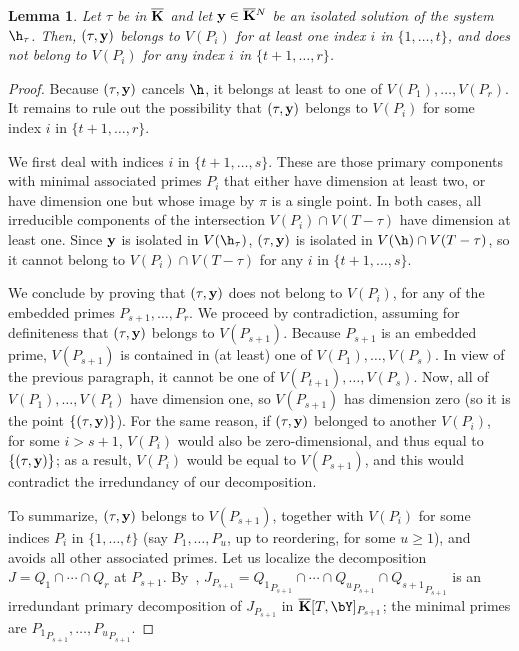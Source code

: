 \documentclass[12pt]{article}
\newtheorem{lemma}[definition]{Lemma}
\begin{document}
\begin{lemma}\label{lemma:vPi}
  Let $\tau$ be in $\overline{\mathbf{K}}$ and let $\mathbf{y} \in \overline{\mathbf{K}}{}^N$ be an isolated
  solution of the system $\h_\tau$. Then, $(\tau,\mathbf{y})$ belongs to $V(P_i)$
  for at least one index $i$ in $\{1,\dots,t\}$, and does not belong
  to $V(P_i)$ for any index $i$ in $\{t+1,\dots,r\}$.
\end{lemma}
\begin{proof}
  Because $(\tau,\mathbf{y})$ cancels $\h$, it belongs at least to one of
  $V(P_1),\dots,V(P_r)$. It remains to rule out the possibility that
  $(\tau,\mathbf{y})$ belongs to $V(P_i)$ for some index $i$ in
  $\{t+1,\dots,r\}$.

  We first deal with indices $i$ in $\{t+1,\dots,s\}$. These are those
  primary components with minimal associated primes $P_i$ that either
  have dimension at least two, or have dimension one but whose image
  by $\pi$ is a single point. In both cases, all irreducible
  components of the intersection $V(P_i)\cap V(T-\tau)$ have dimension
  at least one. Since $\mathbf{y}$ is isolated in $V(\h_\tau)$, $(\tau,\mathbf{y})$ is
  isolated in $V(\h)\cap V(T-\tau)$, so it cannot belong to
  $V(P_i)\cap V(T-\tau)$ for any $i$ in $\{t+1,\dots,s\}$.
  
  We conclude by proving that $(\tau,\mathbf{y})$ does not belong to $V(P_i)$,
  for any of the embedded primes $P_{s+1},\dots,P_r$. We proceed by
  contradiction, assuming for definiteness that $(\tau,\mathbf{y})$ belongs to
  $V(P_{s+1})$. Because $P_{s+1}$ is an embedded prime, $V(P_{s+1})$
  is contained in (at least) one of $V(P_1),\dots,V(P_s)$. In view of
  the previous paragraph, it cannot be one of
  $V(P_{t+1}),\dots,V(P_s)$.  Now, all of $V(P_1),\dots,V(P_t)$ have
  dimension one, so $V(P_{s+1})$ has dimension zero (so it is the point $\{(\tau,\mathbf{y})\}$). For the same
  reason, if $(\tau,\mathbf{y})$ belonged to another $V(P_i)$, for some $i >
  s+1$, $V(P_i)$ would also be zero-dimensional, and thus equal to $\{(\tau,\mathbf{y})\}$; as a result, $V(P_i)$
  would be equal to $V(P_{s+1})$, and this would contradict the
  irredundancy of our decomposition.
  
  To summarize, $(\tau,\mathbf{y})$ belongs to $V(P_{s+1})$, together with
  $V(P_i)$ for some indices $P_i$ in $\{1,\dots,t\}$ (say
  $P_1,\dots,P_u$, up to reordering, for some $u \ge 1$), and avoids
  all other associated primes.  Let us localize the decomposition
  $J=Q_1 \cap \cdots \cap Q_r$ at
  $P_{s+1}$. By~\cite[Proposition~4.9]{AtMc},
  $J_{P_{s+1}}={Q_1}_{P_{s+1}} \cap \cdots \cap {Q_u}_{P_{s+1}}\cap
  {Q_{s+1}}_{P_{s+1}}$ is an irredundant primary decomposition of
  $J_{P_{s+1}}$ in $\KKbar[T,\bY]_{P_{s+1}}$; the minimal primes are
  ${P_1}_{P_{s+1}},\dots,{P_u}_{P_{s+1}}$.


\end{proof}
\end{document}
